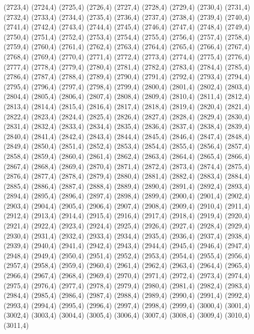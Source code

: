 (2723,4)
(2724,4)
(2725,4)
(2726,4)
(2727,4)
(2728,4)
(2729,4)
(2730,4)
(2731,4)
(2732,4)
(2733,4)
(2734,4)
(2735,4)
(2736,4)
(2737,4)
(2738,4)
(2739,4)
(2740,4)
(2741,4)
(2742,4)
(2743,4)
(2744,4)
(2745,4)
(2746,4)
(2747,4)
(2748,4)
(2749,4)
(2750,4)
(2751,4)
(2752,4)
(2753,4)
(2754,4)
(2755,4)
(2756,4)
(2757,4)
(2758,4)
(2759,4)
(2760,4)
(2761,4)
(2762,4)
(2763,4)
(2764,4)
(2765,4)
(2766,4)
(2767,4)
(2768,4)
(2769,4)
(2770,4)
(2771,4)
(2772,4)
(2773,4)
(2774,4)
(2775,4)
(2776,4)
(2777,4)
(2778,4)
(2779,4)
(2780,4)
(2781,4)
(2782,4)
(2783,4)
(2784,4)
(2785,4)
(2786,4)
(2787,4)
(2788,4)
(2789,4)
(2790,4)
(2791,4)
(2792,4)
(2793,4)
(2794,4)
(2795,4)
(2796,4)
(2797,4)
(2798,4)
(2799,4)
(2800,4)
(2801,4)
(2802,4)
(2803,4)
(2804,4)
(2805,4)
(2806,4)
(2807,4)
(2808,4)
(2809,4)
(2810,4)
(2811,4)
(2812,4)
(2813,4)
(2814,4)
(2815,4)
(2816,4)
(2817,4)
(2818,4)
(2819,4)
(2820,4)
(2821,4)
(2822,4)
(2823,4)
(2824,4)
(2825,4)
(2826,4)
(2827,4)
(2828,4)
(2829,4)
(2830,4)
(2831,4)
(2832,4)
(2833,4)
(2834,4)
(2835,4)
(2836,4)
(2837,4)
(2838,4)
(2839,4)
(2840,4)
(2841,4)
(2842,4)
(2843,4)
(2844,4)
(2845,4)
(2846,4)
(2847,4)
(2848,4)
(2849,4)
(2850,4)
(2851,4)
(2852,4)
(2853,4)
(2854,4)
(2855,4)
(2856,4)
(2857,4)
(2858,4)
(2859,4)
(2860,4)
(2861,4)
(2862,4)
(2863,4)
(2864,4)
(2865,4)
(2866,4)
(2867,4)
(2868,4)
(2869,4)
(2870,4)
(2871,4)
(2872,4)
(2873,4)
(2874,4)
(2875,4)
(2876,4)
(2877,4)
(2878,4)
(2879,4)
(2880,4)
(2881,4)
(2882,4)
(2883,4)
(2884,4)
(2885,4)
(2886,4)
(2887,4)
(2888,4)
(2889,4)
(2890,4)
(2891,4)
(2892,4)
(2893,4)
(2894,4)
(2895,4)
(2896,4)
(2897,4)
(2898,4)
(2899,4)
(2900,4)
(2901,4)
(2902,4)
(2903,4)
(2904,4)
(2905,4)
(2906,4)
(2907,4)
(2908,4)
(2909,4)
(2910,4)
(2911,4)
(2912,4)
(2913,4)
(2914,4)
(2915,4)
(2916,4)
(2917,4)
(2918,4)
(2919,4)
(2920,4)
(2921,4)
(2922,4)
(2923,4)
(2924,4)
(2925,4)
(2926,4)
(2927,4)
(2928,4)
(2929,4)
(2930,4)
(2931,4)
(2932,4)
(2933,4)
(2934,4)
(2935,4)
(2936,4)
(2937,4)
(2938,4)
(2939,4)
(2940,4)
(2941,4)
(2942,4)
(2943,4)
(2944,4)
(2945,4)
(2946,4)
(2947,4)
(2948,4)
(2949,4)
(2950,4)
(2951,4)
(2952,4)
(2953,4)
(2954,4)
(2955,4)
(2956,4)
(2957,4)
(2958,4)
(2959,4)
(2960,4)
(2961,4)
(2962,4)
(2963,4)
(2964,4)
(2965,4)
(2966,4)
(2967,4)
(2968,4)
(2969,4)
(2970,4)
(2971,4)
(2972,4)
(2973,4)
(2974,4)
(2975,4)
(2976,4)
(2977,4)
(2978,4)
(2979,4)
(2980,4)
(2981,4)
(2982,4)
(2983,4)
(2984,4)
(2985,4)
(2986,4)
(2987,4)
(2988,4)
(2989,4)
(2990,4)
(2991,4)
(2992,4)
(2993,4)
(2994,4)
(2995,4)
(2996,4)
(2997,4)
(2998,4)
(2999,4)
(3000,4)
(3001,4)
(3002,4)
(3003,4)
(3004,4)
(3005,4)
(3006,4)
(3007,4)
(3008,4)
(3009,4)
(3010,4)
(3011,4)
